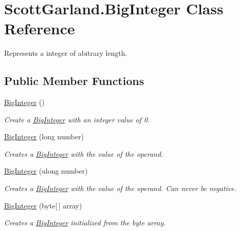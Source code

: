 \hypertarget{class_scott_garland_1_1_big_integer}{}\section{Scott\+Garland.\+Big\+Integer Class Reference}
\label{class_scott_garland_1_1_big_integer}


Represents a integer of abitrary length.  


\subsection*{Public Member Functions}
\begin{DoxyCompactItemize}
\item 
\hyperlink{class_scott_garland_1_1_big_integer_a8255378a9b7d296d78d3bc446f7b3949}{Big\+Integer} ()
\begin{DoxyCompactList}\small\item\em Create a \hyperlink{class_scott_garland_1_1_big_integer}{Big\+Integer} with an integer value of 0. \end{DoxyCompactList}\item 
\hyperlink{class_scott_garland_1_1_big_integer_a814a50a2d47afab9a43e74204a53fcf0}{Big\+Integer} (long number)
\begin{DoxyCompactList}\small\item\em Creates a \hyperlink{class_scott_garland_1_1_big_integer}{Big\+Integer} with the value of the operand. \end{DoxyCompactList}\item 
\hyperlink{class_scott_garland_1_1_big_integer_a0ff4d1469a5c9cdb39cc6bdd0ec995b2}{Big\+Integer} (ulong number)
\begin{DoxyCompactList}\small\item\em Creates a \hyperlink{class_scott_garland_1_1_big_integer}{Big\+Integer} with the value of the operand. Can never be negative. \end{DoxyCompactList}\item 
\hyperlink{class_scott_garland_1_1_big_integer_a780777418993360461e0fe7c46537860}{Big\+Integer} (byte\mbox{[}$\,$\mbox{]} array)
\begin{DoxyCompactList}\small\item\em Creates a \hyperlink{class_scott_garland_1_1_big_integer}{Big\+Integer} initialized from the byte array. \end{DoxyCompactList}\item 

\end{DoxyCompactItemize}
